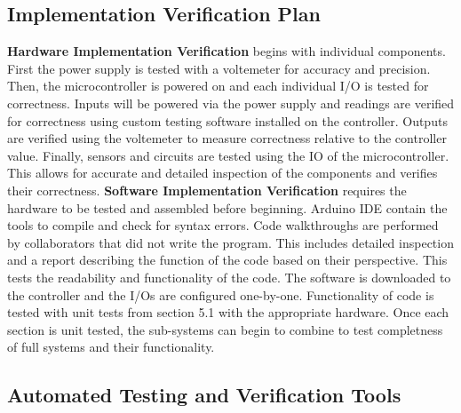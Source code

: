 \documentclass[12pt, titlepage]{article}
\begin{document}
\subsection{Implementation Verification Plan}
\textbf{Hardware Implementation Verification} begins with individual components. First 
the power supply is tested with a voltemeter for accuracy and precision. Then, 
the microcontroller is powered on and each individual I/O is tested for correctness. 
Inputs will be powered via the power supply and readings are verified for correctness 
using custom testing software installed on the controller. Outputs are verified using 
the voltemeter to measure correctness relative to the controller value. Finally, 
sensors and circuits are tested using the IO of the microcontroller. This allows
for accurate and detailed inspection of the components and verifies their correctness. 
\newline 
\newline 
\textbf{Software Implementation Verification} requires the hardware to be tested and 
assembled before beginning. Arduino IDE contain the tools to compile and check for syntax
errors. Code walkthroughs are performed by collaborators that did not write the program. 
This includes detailed inspection and a report describing the function of the code 
based on their perspective. This tests the readability and functionality of the code. 
The software is downloaded to the controller and the I/Os are configured one-by-one. 
Functionality of code is tested with unit tests from section 5.1 with the appropriate hardware. 
Once each section is unit tested, the sub-systems can begin to combine to test completness of full systems and their functionality.


\subsection{Automated Testing and Verification Tools}
\end{document}

